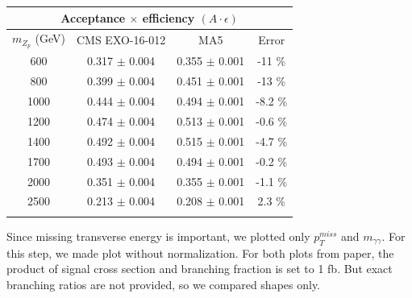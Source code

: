 \documentclass[12pt,A4paper]{article}
\begin{document}
\vskip 10pt


\begin{center}
\begin{tabular}{c c c c}
\hline
\multicolumn{4}{c}{Acceptance $\times$ efficiency $(A \cdot \epsilon)$}\\
\hline
$m_{Z_p}$ (GeV)& CMS EXO-16-012& MA5& Error\\
\hline
600& 0.317 $\pm$ 0.004& 0.355 $\pm$ 0.001& -11 \%\\%
800& 0.399 $\pm$ 0.004& 0.451 $\pm$ 0.001& -13 \%\\%
1000& 0.444 $\pm$ 0.004& 0.494 $\pm$ 0.001& -8.2 \%\\%
1200& 0.474 $\pm$ 0.004& 0.513 $\pm$ 0.001& -0.6 \%\\%
1400& 0.492 $\pm$ 0.004& 0.515  $\pm$ 0.001& -4.7 \%\\%
1700& 0.493 $\pm$ 0.004& 0.494 $\pm$ 0.001& -0.2 \%\\%
2000& 0.351 $\pm$ 0.004& 0.355 $\pm$ 0.001& -1.1 \%\\%
2500& 0.213 $\pm$ 0.004& 0.208 $\pm$ 0.001& 2.3 \%\\%
\hline
\vspace*{20pt}
\end{tabular}
\end{center}

Since missing transverse energy is important, we plotted only $ p_T^{miss}$ and $m_{\gamma\gamma}$. For this step, we made plot without normalization. For both plots from paper, the product of signal cross section and branching fraction is set to 1 fb. But exact branching ratios are not provided, so we compared shapes only.
\end{document}
